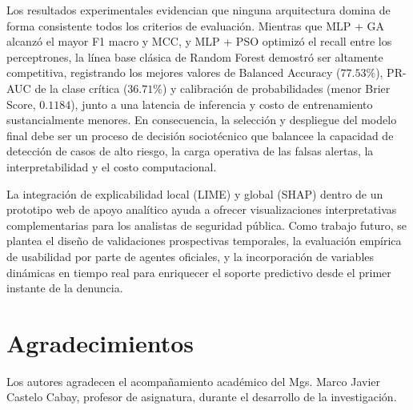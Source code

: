 \documentclass[conference]{IEEEtran}
\begin{document}
Los resultados experimentales evidencian que ninguna arquitectura domina de forma consistente todos los criterios de evaluación. Mientras que MLP + GA alcanzó el mayor F1 macro y MCC, y MLP + PSO optimizó el recall entre los perceptrones, la línea base clásica de Random Forest demostró ser altamente competitiva, registrando los mejores valores de Balanced Accuracy ($77.53\%$), PR-AUC de la clase crítica ($36.71\%$) y calibración de probabilidades (menor Brier Score, $0.1184$), junto a una latencia de inferencia y costo de entrenamiento sustancialmente menores. En consecuencia, la selección y despliegue del modelo final debe ser un proceso de decisión sociotécnico que balancee la capacidad de detección de casos de alto riesgo, la carga operativa de las falsas alertas, la interpretabilidad y el costo computacional.

La integración de explicabilidad local (LIME) y global (SHAP) dentro de un prototipo web de apoyo analítico ayuda a ofrecer visualizaciones interpretativas complementarias para los analistas de seguridad pública. Como trabajo futuro, se plantea el diseño de validaciones prospectivas temporales, la evaluación empírica de usabilidad por parte de agentes oficiales, y la incorporación de variables dinámicas en tiempo real para enriquecer el soporte predictivo desde el primer instante de la denuncia.

\section*{Agradecimientos}
Los autores agradecen el acompañamiento académico del Mgs. Marco Javier Castelo Cabay, profesor de asignatura, durante el desarrollo de la investigación.
\end{document}
